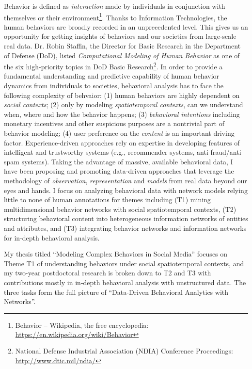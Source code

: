 \documentclass[10.5pt]{article}
\begin{document}
Behavior is defined as \textit{interaction} made by individuals in conjunction with themselves or their environment\footnote{Behavior -- Wikipedia, the free encyclopedia: \url{https://en.wikipedia.org/wiki/Behavior}}. Thanks to Information Technologies, the human behaviors are broadly recorded in an unprecedented level. This gives us an opportunity for getting insights of behaviors and our societies from large-scale real data. Dr. Robin Staffin, the Director for Basic Research in the Department of Defense (DoD), listed \textit{Computational Modeling of Human Behavior} as one of the six high-priority topics in DoD Basic Research\footnote{National Defense Industrial Association (NDIA) Conference Proceedings: \url{http://www.dtic.mil/ndia/}}. In order to provide a fundamental understanding and predictive capability of human behavior dynamics from individuals to societies, behavioral analysis has to face the following complexity of behvaior: (1) human behaviors are highly dependent on \textit{social contexts}; (2) only by modeling \textit{spatiotemporal contexts}, can we understand when, where and how the behavior happens; (3) \textit{behavioral intentions} including monetary incentives and other suspicious purposes are a nontrivial part of behavior modeling; (4) user preference on the \textit{content} is an important driving factor. Experience-driven approaches rely on expertise in developing features of intelligent and trustworthy systems (e.g., recommender systems, anti-fraud/anti-spam systems). Taking the advantage of massive, available behavioral data, I have been proposing and promoting data-driven approaches that leverage the methodology of \textit{observation}, \textit{representation} and \textit{models} from real data beyond our eyes and hands. I focus on analyzing behavioral data with network models relying little to none of human annotations for themes including (T1) mining multidimensional behavior networks with social spatiotemporal contexts, (T2) structuring behavioral content into heterogeneous information networks of entities and attributes, and (T3) integrating behavior networks and information networks for in-depth behavioral analysis.

\vskip 0.10in
\vskip 0.01in

My thesis titled ``Modeling Complex Behaviors in Social Media'' focuses on Theme T1 of understanding behaviors under social spatiotemporal contexts, and my two-year postdoctoral research is broken down to T2 and T3 with contributions mostly in in-depth behavioral analysis with unstructured data. The three tasks form the full picture of ``Data-Driven Behavioral Analytics with Networks''.
\end{document}
